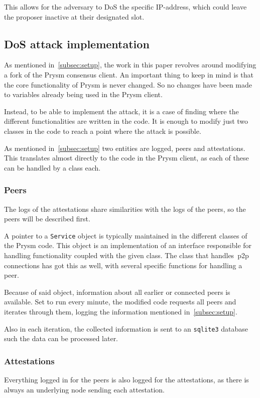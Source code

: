 This allows for the adversary to DoS the specific IP-address,
which could leave the proposer inactive at their designated slot.

\subsection{DoS attack implementation}\label{subsec:attack-implementation}
As mentioned in~\autoref{subsec:setup},
the work in this paper revolves around modifying a fork of the Prysm consensus client.
An important thing to keep in mind is that the core functionality of Prysm is never changed.
So no changes have been made to variables already being used in the Prysm client.

Instead, to be able to implement the attack,
it is a case of finding where the different functionalities are written in the code.
It is enough to modify just two classes in the code to reach a point where the attack is possible.

As mentioned in~\autoref{subsec:setup} two entities are logged, peers and attestations.
This translates almost directly to the code in the Prysm client, as each of these can be handled by a class each.

\subsubsection{Peers}\label{subsubsec:peers}
The logs of the attestations share similarities with the logs of the peers, so the peers will be described first.

A pointer to a \texttt{Service} object is typically maintained in the different classes of the Prysm code.
This object is an implementation of an interface responsible for handling functionality coupled with the given class.
The class that handles~\gls{p2p} connections has got this as well, with several specific functions for handling a peer.

Because of said object, information about all earlier or connected peers is available.
Set to run every minute, the modified code requests all peers and iterates through them,
logging the information mentioned in~\autoref{subsec:setup}.


Also in each iteration,
the collected information is sent to an \texttt{sqlite3} database such the data can be processed later.

\subsubsection{Attestations}\label{subsubsec:attestations}
Everything logged in for the peers is also logged for the attestations,
as there is always an underlying node sending each attestation.

